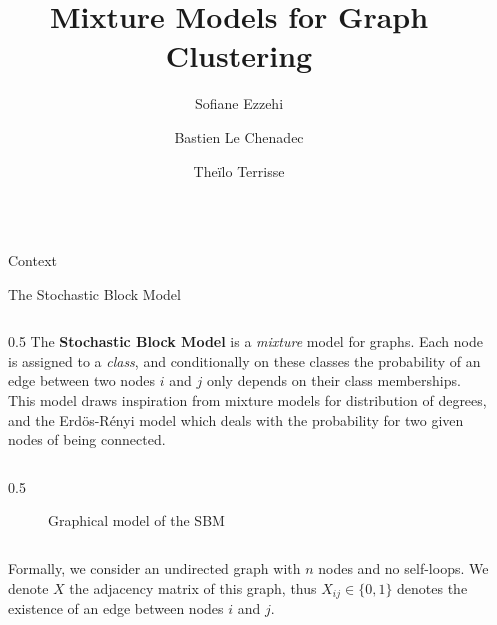 \documentclass[final]{beamer}
\title{Mixture Models for Graph Clustering}
\author{Sofiane Ezzehi \inst{1} \and Bastien Le Chenadec \inst{1} \and Theïlo Terrisse \inst{1}}
\institute[shortinst]{École des Ponts ParisTech}
\newlength{\sepwidth}
\newlength{\colwidth}
\newcommand{\separatorcolumn}{\begin{column}{\sepwidth}\end{column}}
\begin{document}
\begin{frame}[t]
  \begin{columns}[t]
    \separatorcolumn

    \begin{column}{\colwidth}

      \begin{block}{Context}
      \end{block}

      \begin{block}{The Stochastic Block Model}
        \begin{column}{0.5\colwidth}
          \justifying
          The \textbf{Stochastic Block Model} is a \textit{mixture} model for graphs. Each node is assigned to a \textit{class}, and conditionally on these classes the probability of an edge between two nodes $i$ and $j$ only depends on their class memberships. This model draws inspiration from mixture models for distribution of degrees, and the Erdös-Rényi model which deals with the probability for two given nodes of being connected.
        \end{column}
        \begin{column}{0.5\colwidth}
          \begin{figure}[H]
            \centering
            \caption{Graphical model of the SBM}
            \label{fig:graphical_model}
          \end{figure}
        \end{column}

        Formally, we consider an undirected graph with $n$ nodes and no self-loops. We denote $X$ the adjacency matrix of this graph, thus $X_{ij}\in \{0,1\}$ denotes the existence of an edge between nodes $i$ and $j$.


\end{block}
\end{column}
\end{columns}
\end{frame}
\end{document}
